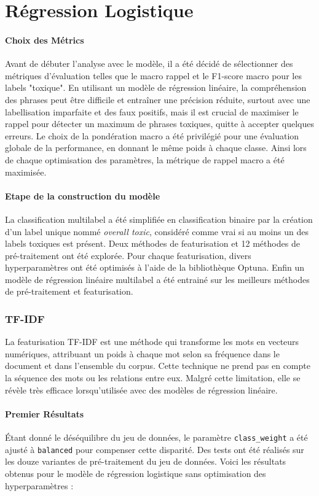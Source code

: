 \chapter{Régression Logistique}

\subsubsection{Choix des Métrics}
Avant de débuter l'analyse avec le modèle, il a été décidé de sélectionner des métriques d'évaluation telles que le macro rappel et le F1-score macro pour les labels "toxique".
En utilisant un modèle de régression linéaire, la compréhension des phrases peut être difficile et entraîner une précision réduite, surtout avec une labellisation imparfaite et des faux positifs, mais il est crucial de maximiser le rappel pour détecter un maximum de phrases toxiques, quitte à accepter quelques erreurs.
Le choix de la pondération macro a été privilégié pour une évaluation globale de la performance, en donnant le même poids à chaque classe.
Ainsi lors de chaque optimisation des paramètres, la métrique de rappel macro a été maximisée.


\subsubsection{Etape de la construction du modèle}
La classification multilabel a été simplifiée en classification binaire par la création d'un label unique nommé \textit{overall toxic}, considéré comme vrai si au moins un des labels toxiques est présent. 
Deux méthodes de featurisation et 12 méthodes de pré-traitement ont été explorée. Pour chaque featurisation, divers hyperparamètres ont été optimisés à l'aide de la bibliothèque Optuna. 
Enfin un modèle de régression linéaire multilabel a été entrainé sur les meilleurs méthodes de pré-traitement et featurisation.

\subsection{TF-IDF}
La featurisation TF-IDF est une méthode qui transforme les mots en vecteurs numériques, attribuant un poids à chaque mot selon sa fréquence dans le document et dans l'ensemble du corpus. 
Cette technique ne prend pas en compte la séquence des mots ou les relations entre eux. 
Malgré cette limitation, elle se révèle très efficace lorsqu'utilisée avec des modèles de régression linéaire.

\subsubsection{Premier Résultats}
Étant donné le déséquilibre du jeu de données, le paramètre \texttt{class\_weight} a été ajusté à \texttt{balanced} pour compenser cette disparité. 
Des tests ont été réalisés sur les douze variantes de pré-traitement du jeu de données.
Voici les résultats obtenus pour le modèle de régression logistique sans optimisation des hyperparamètres :

